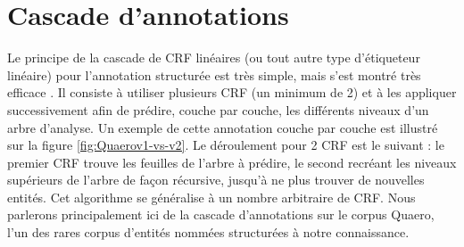 \documentclass[12pt,a4paper,times,twoside,openright]{report}
\begin{document}
    \section{Cascade d'annotations}
    \label{sec:annotation-cascade}
Le principe de la cascade de CRF linéaires (ou tout autre type d'étiqueteur linéaire) pour l'annotation structurée est très simple, mais s'est montré très efficace \citep{ratnaparkhi1997linear,guodong2004exploring,alex2007recognising,Tsuruoka09,raymond2013robust}. Il consiste à utiliser plusieurs CRF (un minimum de 2) et à les appliquer successivement afin de prédire, couche par couche, les différents niveaux d'un arbre d'analyse. Un exemple de cette annotation couche par couche est illustré sur la figure \ref{fig:Quaerov1-vs-v2}. Le déroulement pour 2 CRF est le suivant : le premier CRF trouve les feuilles de l'arbre à prédire, le second recréant les niveaux supérieurs de l'arbre de façon récursive, jusqu'à ne plus trouver de nouvelles entités. Cet algorithme se généralise à un nombre arbitraire de CRF. Nous parlerons principalement ici de la cascade d'annotations sur le corpus Quaero, l'un des rares corpus d'entités nommées structurées à notre connaissance.
\end{document}
